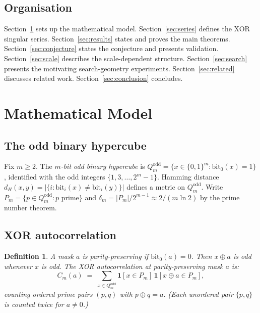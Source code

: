 \documentclass[12pt]{article}
\newtheorem{definition}{Definition}
\newcommand{\dH}{d_H}
\begin{document}
\subsection{Organisation}

Section~\ref{sec:model} sets up the mathematical model.
Section~\ref{sec:series} defines the XOR singular series.
Section~\ref{sec:results} states and proves the main theorems.
Section~\ref{sec:conjecture} states the conjecture and presents validation.
Section~\ref{sec:scale} describes the scale-dependent structure.
Section~\ref{sec:search} presents the motivating search-geometry experiments.
Section~\ref{sec:related} discusses related work.
Section~\ref{sec:conclusion} concludes.

\section{Mathematical Model}
\label{sec:model}

\subsection{The odd binary hypercube}

Fix $m \geq 2$.
The \emph{$m$-bit odd binary hypercube} is
$Q_m^{\mathrm{odd}} = \{x \in \{0,1\}^m : \mathrm{bit}_0(x) = 1\}$,
identified with the odd integers $\{1,3,\ldots,2^m-1\}$.
Hamming distance $\dH(x,y) = |\{i : \mathrm{bit}_i(x) \neq \mathrm{bit}_i(y)\}|$
defines a metric on $Q_m^{\mathrm{odd}}$.
Write $P_m = \{p \in Q_m^{\mathrm{odd}} : p \text{ prime}\}$
and $\delta_m = |P_m|/2^{m-1} \approx 2/(m \ln 2)$ by the prime number theorem.

\subsection{XOR autocorrelation}

\begin{definition}
A mask $a$ is \emph{parity-preserving} if $\mathrm{bit}_0(a) = 0$.
Then $x \oplus a$ is odd whenever $x$ is odd.
The \emph{XOR autocorrelation} at parity-preserving mask $a$ is:
\[
  C_m(a)
  \;=\;
  \sum_{x \in Q_m^{\mathrm{odd}}}
  \mathbf{1}[x \in P_m]\,\mathbf{1}[x \oplus a \in P_m],
\]
counting \emph{ordered} prime pairs $(p,q)$ with $p \oplus q = a$.
(Each unordered pair $\{p,q\}$ is counted twice for $a \neq 0$.)
\end{definition}
\end{document}
